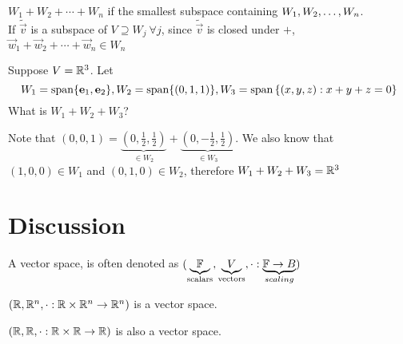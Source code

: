 \begin{remark}
    $W_1 + W_2 + \cdots + W_n$ if the smallest subspace containing ${W}_1,{W}_2, \ldots, {W}_{n}$. \\
    If $\tilde {\vec v}$ is a subspace of $V \supseteq W_j \ \forall j$, since $\tilde {\vec v}$ is closed under $+$, $\vec w_1 + \vec w_2 + \cdots + \vec w_n \in W_n$
\end{remark}
\begin{example}
Suppose $V = \mathbb R^3$. Let \[W_1 = \text{span} \{\mathbf e_1, \mathbf e_2\}, W_2 = \text{span} \{(0,1,1)\}, W_3 = \text{span} \left\{ (x,y,z) : x + y + z = 0 \right\}\] 
What is $W_1 + W_2 + W_3$?
\end{example}
Note that $(0,0,1) = \underbrace{\left(0,\frac12,\frac12\right)}_{\in W_2} +  \underbrace{\left(0,-\frac12,\frac12\right)}_{\in W_3}$. We also know that $(1,0,0) \in W_1$ and $(0,1,0) \in W_2$, therefore $W_1 + W_2 + W_3 = \mathbb R^3$ \\
\section*{Discussion}
\begin{definition}
    A vector space, is often denoted as $(\underbrace{\mathbb F}_{\text{scalars}}, \underbrace{V}_{\text{vectors}}, \cdot : \underbrace{\mathbb F \to B}_{scaling})$
\end{definition}
\begin{example}
    $(\mathbb R,\mathbb R^n, \cdot : \mathbb R \times \mathbb R^n \to \mathbb R^n)$ is a vector space.
\end{example}
\begin{example}
    $(\mathbb R, \mathbb R, \cdot : \mathbb R \times \mathbb R \to \mathbb R)$ is also a vector space.
\end{example}
